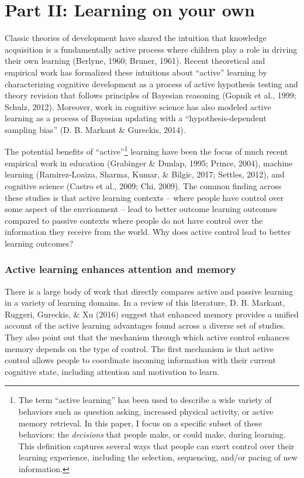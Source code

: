 \documentclass[a4paper,man,apacite,floatsintext]{apa6}
\begin{document}
\section{Part II: Learning on your
own}\label{part-ii-learning-on-your-own}

Classic theories of development have shared the intuition that knowledge
acquisition is a fundamentally active process where children play a role
in driving their own learning (Berlyne, 1960; Bruner, 1961). Recent
theoretical and empirical work has formalized these intuitions about
``active'' learning by characterizing cognitive development as a process
of active hypothesis testing and theory revision that follows principles
of Bayesian reasoning (Gopnik et al., 1999; Schulz, 2012). Moreover,
work in cognitive science has also modeled active learning as a process
of Bayesian updating with a ``hypothesis-dependent sampling bias'' (D.
B. Markant \& Gureckis, 2014).

The potential benefits of ``active''\footnote{The term ``active
  learning'' has been used to describe a wide variety of behaviors such
  as question asking, increased physical activity, or active memory
  retrieval. In this paper, I focus on a specific subset of these
  behaviors: the \emph{decisions} that people make, or could make,
  during learning. This definition captures several ways that people can
  exert control over their learning experience, including the selection,
  sequencing, and/or pacing of new information.} learning have been the
focus of much recent empirical work in education (Grabinger \& Dunlap,
1995; Prince, 2004), machine learning (Ramirez-Loaiza, Sharma, Kumar, \&
Bilgic, 2017; Settles, 2012), and cognitive science (Castro et al.,
2009; Chi, 2009). The common finding across these studies is that active
learning contexts -- where people have control over some aspect of the
envrionment -- lead to better outcome learning outcomes compared to
passive contexts where people do not have control over the information
they receive from the world. Why does active control lead to better
learning outcomes?

\subsubsection{Active learning enhances attention and
memory}\label{active-learning-enhances-attention-and-memory}

There is a large body of work that directly compares active and passive
learning in a variety of learning domains. In a review of this
literature, D. B. Markant, Ruggeri, Gureckis, \& Xu (2016) suggest that
enhanced memory provides a unified account of the active learning
advantages found across a diverse set of studies. They also point out
that the mechanism through which active control enhances memory depends
on the type of control. The first mechanism is that active control
allows people to coordinate incoming information with their current
cognitive state, including attention and motivation to learn.
\end{document}
